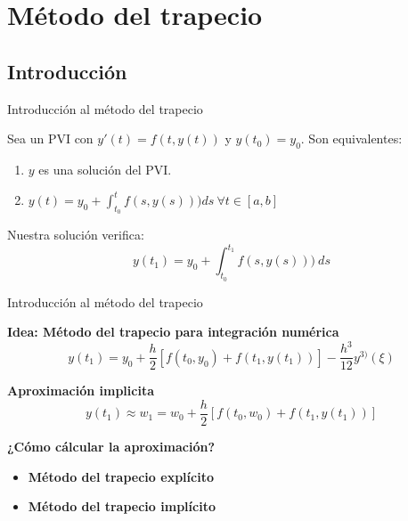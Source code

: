 \section{Método del trapecio}

	\subsection{Introducción}

		\begin{frame}{Introducción al método del trapecio}
			\fontsize{11}{11}\selectfont				
			\begin{proposition} \label{prop:sol-eq}
				Sea un PVI con $y'(t) = f(t,y(t))$ y $y(t_0) = y_0$.  Son equivalentes:
				\begin{enumerate}
					\item $y$ es una solución del PVI.
					\item $y(t) = y_0 + \int_{t_0}^{t} f(s,y(s))) ds \ \forall t \in [a,b]$
				\end{enumerate}
			\end{proposition}

			\kern 7mm
			\begin{tcolorbox}[colback=ChetwodeBlue!10,colframe=ChetwodeBlue!60]
				Nuestra solución verifica:
				\begin{equation*}
					y(t_1)  = y_0 + \int_{t_0}^{t_1} f(s,y(s))) \ ds
				\end{equation*}		
			\end{tcolorbox}
		\end{frame}

		\begin{frame}{Introducción al método del trapecio}
			\fontsize{10}{10}\selectfont				

			\begin{tcolorbox}[colback=ChetwodeBlue!10,colframe=ChetwodeBlue!60]
				\centering
				\textbf{Idea: Método del trapecio para integración numérica}
				\begin{equation} \label{eq:trapecio-igualdad}
					y(t_{1}) = y_0 + \frac{h}{2} \left[f(t_0,y_0) + f(t_1, y(t_1))\right] - \frac{h^3}{12}y^{3)}(\xi)
				\end{equation}

				\textbf{Aproximación implicita}	
				\begin{equation} \label{eq:app}
					y(t_1) \approx w_1 = w_0 + \frac{h}{2} \left[f(t_0,w_0) + f(t_1, y(t_1))\right]
				\end{equation}			
			\end{tcolorbox}			

			\kern 1mm
			\centering
			\textbf{¿Cómo cálcular la aproximación?}

			\kern 1mm
			\begin{itemize}
				\item \color{ChetwodeBlue}\textbf{Método del trapecio explícito}
				\item \color{ChetwodeBlue}\textbf{Método del trapecio implícito}
			\end{itemize}
		\end{frame}

